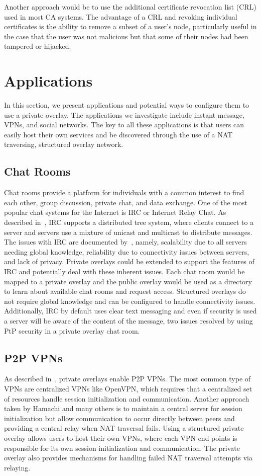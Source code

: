 \documentclass[conference]{IEEEtran}
\begin{document}
Another approach would be to use the additional certificate revocation list
(CRL) used in most CA systems.  The advantage of a CRL and revoking individual
certificates is the ability to remove a subset of a user's node, particularly
useful in the case that the user was not malicious but that some of their nodes
had been tampered or hijacked.

\section{Applications}
\label{applications}
In this section, we present applications and potential ways to configure them
to use a private overlay.  The applications we investigate include instant
message, VPNs, and social networks.  The key to all these applications is that
users can easily host their own services and be discovered through the use of
a NAT traversing, structured overlay network.

\subsection{Chat Rooms}
Chat rooms provide a platform for individuals with a common interest to find
each other, group discussion, private chat, and data exchange.  One of the most
popular chat systems for the Internet is IRC or Internet Relay Chat.  As
described in~\cite{irc}, IRC supports a distributed tree system, where clients
connect to a server and servers use a mixture of unicast and multicast to
distribute messages.  The issues with IRC are documented by~\cite{irc_arch},
namely, scalability due to all servers needing global knowledge, reliability due
to connectivity issues between servers, and lack of privacy.  Private overlays
could be extended to support the features of IRC and potentially deal with these
inherent issues.  Each chat room would be mapped to a private overlay and the
public overlay would be used as a directory to learn about available chat rooms
and request access.  Structured overlays do not require global knowledge and can
be configured to handle connectivity issues.  Additionally, IRC by default uses
clear text messaging and even if security is used a server will be aware of the
content of the message, two issues resolved by using PtP security in a private
overlay chat room.  

\subsection{P2P VPNs}
As described in~\cite{nsdi10}, private overlays enable P2P VPNs.  The most
common type of VPNs are centralized VPNs like OpenVPN, which requires that a
centralized set of resources handle session initialization and communication.
Another approach taken by Hamachi and many others is to maintain a central
server for session initialization but allow communication to occur directly
between peers and providing a central relay when NAT traversal fails.  Using
a structured private overlay allows users to host their own VPNs, where each
VPN end points is responsible for its own session initialization and
communication.  The private overlay also provides mechanisms for handling
failed NAT traversal attempts via relaying.
\end{document}
